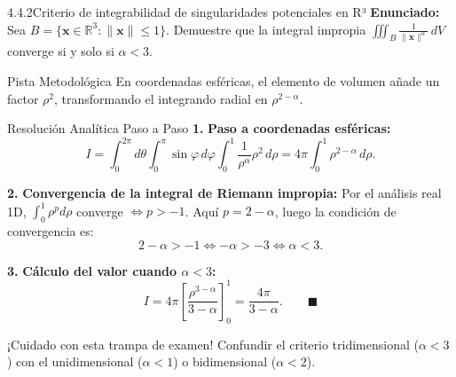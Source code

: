 \documentclass[11pt,a4paper]{article}
\begin{document}
\begin{nivelbox}{4.4.2}{Criterio de integrabilidad de singularidades potenciales en R³}
\textbf{Enunciado:}\\
Sea $B = \{ \mathbf{x} \in \mathbb{R}^3 : \|\mathbf{x}\| \le 1 \}$. Demuestre que la integral impropia $\iiint_B \frac{1}{\|\mathbf{x}\|^\alpha} \, dV$ converge si y solo si $\alpha < 3$.

\begin{observacionbox}{Pista Metodológica}
En coordenadas esféricas, el elemento de volumen añade un factor $\rho^2$, transformando el integrando radial en $\rho^{2 - \alpha}$.
\end{observacionbox}

\begin{ejerciciobox}{Resolución Analítica Paso a Paso}
\smallskip\noindent\textbf{1.} \textbf{Paso a coordenadas esféricas:}
\[I = \int_0^{2\pi} d\theta \int_0^\pi \sin\varphi \, d\varphi \int_0^1 \frac{1}{\rho^\alpha} \rho^2 \, d\rho = 4\pi \int_0^1 \rho^{2 - \alpha} \, d\rho.\]

\smallskip\noindent\textbf{2.} \textbf{Convergencia de la integral de Riemann impropia:}
Por el análisis real 1D, $\int_0^1 \rho^p d\rho$ converge $\iff p > -1$.
Aquí $p = 2 - \alpha$, luego la condición de convergencia es:
\[2 - \alpha > -1 \iff -\alpha > -3 \iff \alpha < 3.\]

\smallskip\noindent\textbf{3.} \textbf{Cálculo del valor cuando $\alpha < 3$:}
\[I = 4\pi \left[ \frac{\rho^{3 - \alpha}}{3 - \alpha} \right]_0^1 = \frac{4\pi}{3 - \alpha}. \qquad \blacksquare\]
\end{ejerciciobox}

\begin{errorbox}{¡Cuidado con esta trampa de examen!}
Confundir el criterio tridimensional ($\alpha < 3$) con el unidimensional ($\alpha < 1$) o bidimensional ($\alpha < 2$).
\end{errorbox}
\end{nivelbox}
\bigskip
\end{document}
